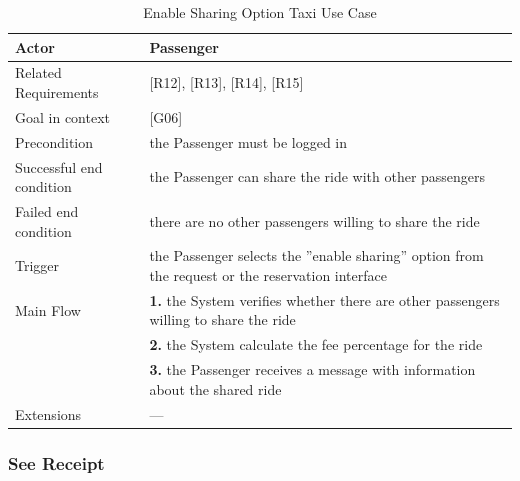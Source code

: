 \begin{table}[htbp]
\begin{center}
\begin{tabular}[t]{p{}p{}}

\hline
Actor & Passenger \\
\hline
Related Requirements & [R12], [R13], [R14], [R15] \\
\hline
Goal in context & [G06] \\
\hline
Precondition & the Passenger must be logged in \\
\hline
Successful end condition & 
the Passenger can share the ride with other passengers \\
\hline
Failed end condition & there are no other passengers willing to share the ride  \\
\hline
Trigger & the Passenger selects the ''enable sharing'' option from the request or the reservation interface \\
\hline
Main Flow & \textbf{1.} the System verifies whether there are other passengers willing to share the ride \\
& \textbf{2.} the System calculate the fee percentage for the ride \\
& \textbf{3.} the Passenger receives a message with information about the shared ride \\
\hline
Extensions & --- \\
\hline

\end{tabular}
\end{center}
\caption{Enable Sharing Option Taxi Use Case}
\end{table}
\clearpage

\subsubsection{See Receipt}

